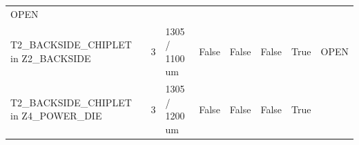 \documentclass[10pt,]{article}
\begin{document}
\begin{longtable}[]{@{}llllllll@{}}
\begin{minipage}[t]{0.10\columnwidth}
OPEN\strut
\end{minipage}\tabularnewline
\begin{minipage}[t]{0.10\columnwidth}\raggedright
T2\_BACKSIDE\_CHIPLET in Z2\_BACKSIDE\strut
\end{minipage} & \begin{minipage}[t]{0.10\columnwidth}\raggedright
3\strut
\end{minipage} & \begin{minipage}[t]{0.10\columnwidth}\raggedright
1305 / 1100 um\strut
\end{minipage} & \begin{minipage}[t]{0.10\columnwidth}\raggedright
False\strut
\end{minipage} & \begin{minipage}[t]{0.10\columnwidth}\raggedright
False\strut
\end{minipage} & \begin{minipage}[t]{0.10\columnwidth}\raggedright
False\strut
\end{minipage} & \begin{minipage}[t]{0.10\columnwidth}\raggedright
True\strut
\end{minipage} & \begin{minipage}[t]{0.10\columnwidth}\raggedright
OPEN\strut
\end{minipage}\tabularnewline
\begin{minipage}[t]{0.10\columnwidth}\raggedright
T2\_BACKSIDE\_CHIPLET in Z4\_POWER\_DIE\strut
\end{minipage} & \begin{minipage}[t]{0.10\columnwidth}\raggedright
3\strut
\end{minipage} & \begin{minipage}[t]{0.10\columnwidth}\raggedright
1305 / 1200 um\strut
\end{minipage} & \begin{minipage}[t]{0.10\columnwidth}\raggedright
False\strut
\end{minipage} & \begin{minipage}[t]{0.10\columnwidth}\raggedright
False\strut
\end{minipage} & \begin{minipage}[t]{0.10\columnwidth}\raggedright
False\strut
\end{minipage} & \begin{minipage}[t]{0.10\columnwidth}\raggedright
True\strut
\end{minipage} & \begin{minipage}[t]{0.10\columnwidth}\raggedright

\end{minipage}
\end{longtable}
\end{document}
